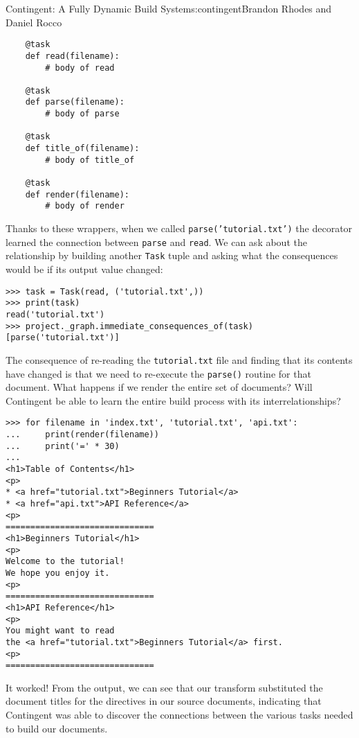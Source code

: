\begin{aosachapter}{Contingent: A Fully Dynamic Build System}{s:contingent}{Brandon Rhodes and Daniel Rocco}
\begin{verbatim}
    @task
    def read(filename):
        # body of read

    @task
    def parse(filename):
        # body of parse

    @task
    def title_of(filename):
        # body of title_of

    @task
    def render(filename):
        # body of render
\end{verbatim}

Thanks to these wrappers, when we called \texttt{parse('tutorial.txt')}
the decorator learned the connection between \texttt{parse} and
\texttt{read}. We can ask about the relationship by building another
\texttt{Task} tuple and asking what the consequences would be if its
output value changed:

\begin{verbatim}
>>> task = Task(read, ('tutorial.txt',))
>>> print(task)
read('tutorial.txt')
>>> project._graph.immediate_consequences_of(task)
[parse('tutorial.txt')]
\end{verbatim}

The consequence of re-reading the \texttt{tutorial.txt} file and finding
that its contents have changed is that we need to re-execute the
\texttt{parse()} routine for that document. What happens if we render
the entire set of documents? Will Contingent be able to learn the entire
build process with its interrelationships?

\begin{verbatim}
>>> for filename in 'index.txt', 'tutorial.txt', 'api.txt':
...     print(render(filename))
...     print('=' * 30)
...
<h1>Table of Contents</h1>
<p>
* <a href="tutorial.txt">Beginners Tutorial</a>
* <a href="api.txt">API Reference</a>
<p>
==============================
<h1>Beginners Tutorial</h1>
<p>
Welcome to the tutorial!
We hope you enjoy it.
<p>
==============================
<h1>API Reference</h1>
<p>
You might want to read
the <a href="tutorial.txt">Beginners Tutorial</a> first.
<p>
==============================
\end{verbatim}

It worked! From the output, we can see that our transform substituted
the document titles for the directives in our source documents,
indicating that Contingent was able to discover the connections between
the various tasks needed to build our documents.



\end{aosachapter}
